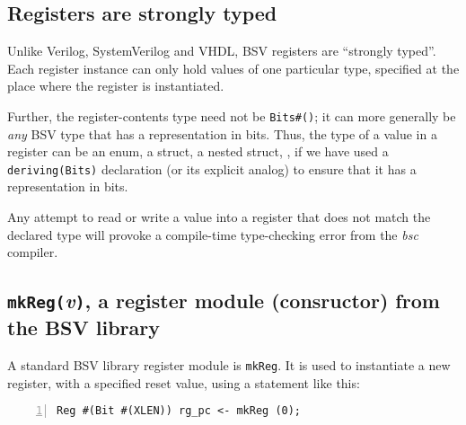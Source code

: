
\subsection{Registers are strongly typed}


Unlike Verilog, SystemVerilog and VHDL, BSV registers are ``strongly
typed''.  Each register instance can only hold values of one
particular type, specified at the place where the register is
instantiated.

Further, the register-contents type need not be \verb|Bits#()|; it can
more generally be \emph{any} BSV type that has a representation in
bits.  Thus, the type of a value in a register can be an enum, a
struct, a nested struct, {\etc}, if we have used a
\verb|deriving(Bits)| declaration (or its explicit analog) to ensure
that it has a representation in bits.

Any attempt to read or write a value into a register that does not
match the declared type will provoke a compile-time type-checking
error from the \emph{bsc} compiler.


\subsection{{\tt mkReg(}\emph{v}{\tt )}, a register module (consructor) from the BSV library}




A standard BSV library register module is \verb|mkReg|.  It is used to
instantiate a new register, with a specified reset value, using a
statement like this:


{\small
\begin{Verbatim}[frame=single, numbers=left]
    Reg #(Bit #(XLEN)) rg_pc <- mkReg (0);
\end{Verbatim}
}

